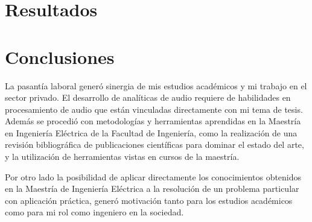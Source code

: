 \documentclass{article}
\begin{document}

\section{Resultados}
\label{resultados}


\section{Conclusiones}
\label{concl}
La pasantía laboral generó sinergia de mis estudios académicos y mi trabajo en el sector privado. El desarrollo de analíticas de audio requiere de habilidades en procesamiento de audio que están vinculadas directamente con mi tema de tesis. Además se procedió con metodologías y herramientas aprendidas en la Maestría en Ingeniería Eléctrica de la Facultad de Ingeniería, como la realización de una revisión bibliográfica de publicaciones científicas para dominar el estado del arte, y la utilización de herramientas vistas en cursos de la maestría.
\smallskip

Por otro lado la posibilidad de aplicar directamente los conocimientos obtenidos en la Maestría de Ingeniería Eléctrica a la resolución de un problema particular con aplicación práctica, generó motivación tanto para los estudios académicos como para mi rol como ingeniero en la sociedad.  



\newpage



\end{document}
